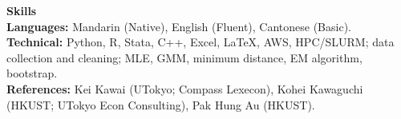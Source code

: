 \documentclass[11pt,letterpaper]{article}
\begin{document}
\vspace{0.15pt}

{\large \textbf{Skills}}\\[-0.5pt]
\textbf{Languages:} Mandarin (Native), English (Fluent), Cantonese (Basic).\\
\textbf{Technical:} Python, R, Stata, C++, Excel, \LaTeX, AWS, HPC/SLURM; data collection and cleaning; MLE, GMM, minimum distance, EM algorithm, bootstrap.\\
\textbf{References:} Kei Kawai (UTokyo; Compass Lexecon), Kohei Kawaguchi (HKUST; UTokyo Econ Consulting), Pak Hung Au (HKUST).
\end{document}
